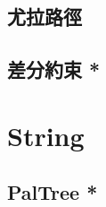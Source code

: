 \documentclass[a4paper,10pt,twocolumn,oneside]{article}
\begin{document}
\subsection{尤拉路徑}


% 

% 

% 

% 

\subsection{差分約束 *}


%

% 

\section{String}

\subsection{PalTree *}

\end{document}
